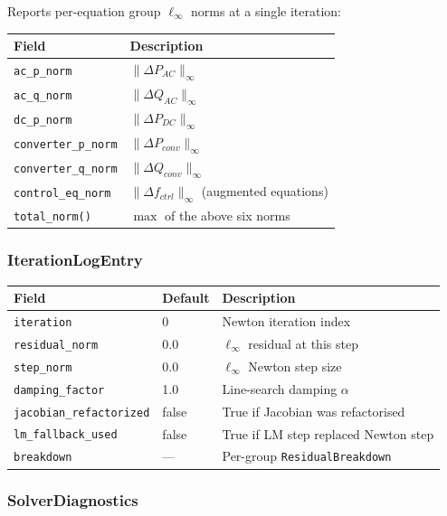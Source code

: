Reports per-equation group $\ell_\infty$ norms at a single iteration:
\begin{center}
\begin{tabular}{ll}
\hline\hline
\textbf{Field} & \textbf{Description} \\
\hline
\texttt{ac\_p\_norm} & $\|\Delta P_{AC}\|_\infty$ \\
\texttt{ac\_q\_norm} & $\|\Delta Q_{AC}\|_\infty$ \\
\texttt{dc\_p\_norm} & $\|\Delta P_{DC}\|_\infty$ \\
\texttt{converter\_p\_norm} & $\|\Delta P_{conv}\|_\infty$ \\
\texttt{converter\_q\_norm} & $\|\Delta Q_{conv}\|_\infty$ \\
\texttt{control\_eq\_norm} & $\|\Delta f_{ctrl}\|_\infty$ (augmented equations) \\
\texttt{total\_norm()} & $\max$ of the above six norms \\
\hline\hline
\end{tabular}
\end{center}

\subsubsection{IterationLogEntry}

\begin{center}
\begin{tabular}{lll}
\hline\hline
\textbf{Field} & \textbf{Default} & \textbf{Description} \\
\hline
\texttt{iteration} & 0 & Newton iteration index \\
\texttt{residual\_norm} & 0.0 & $\ell_\infty$ residual at this step \\
\texttt{step\_norm} & 0.0 & $\ell_\infty$ Newton step size \\
\texttt{damping\_factor} & 1.0 & Line-search damping $\alpha$ \\
\texttt{jacobian\_refactorized} & false & True if Jacobian was refactorised \\
\texttt{lm\_fallback\_used} & false & True if LM step replaced Newton step \\
\texttt{breakdown} & --- & Per-group \texttt{ResidualBreakdown} \\
\hline\hline
\end{tabular}
\end{center}

\subsubsection{SolverDiagnostics}

